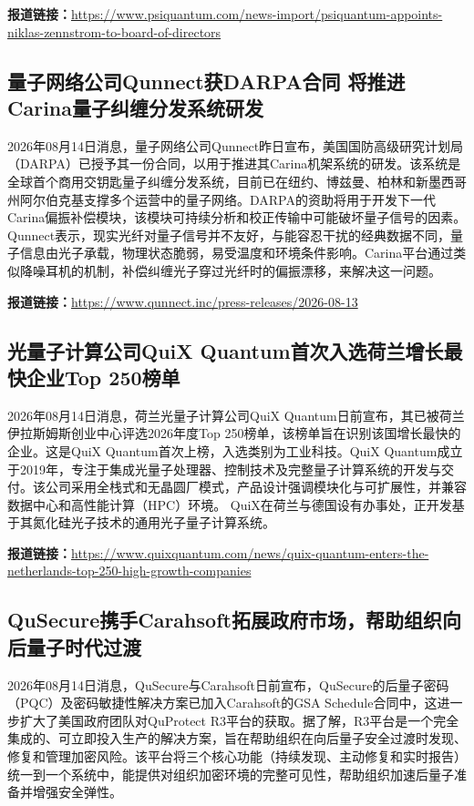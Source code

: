 \documentclass[12pt,a4paper]{ctexart}
\begin{document}
\noindent\textbf{报道链接：}\url{https://www.psiquantum.com/news-import/psiquantum-appoints-niklas-zennstrom-to-board-of-directors}

\subsection{ 量子网络公司Qunnect获DARPA合同 将推进Carina量子纠缠分发系统研发 }

2026年08月14日消息，量子网络公司Qunnect昨日宣布，美国国防高级研究计划局（DARPA）已授予其一份合同，以用于推进其Carina机架系统的研发。该系统是全球首个商用交钥匙量子纠缠分发系统，目前已在纽约、博兹曼、柏林和新墨西哥州阿尔伯克基支撑多个运营中的量子网络。DARPA的资助将用于开发下一代Carina偏振补偿模块，该模块可持续分析和校正传输中可能破坏量子信号的因素。Qunnect表示，现实光纤对量子信号并不友好，与能容忍干扰的经典数据不同，量子信息由光子承载，物理状态脆弱，易受温度和环境条件影响。Carina平台通过类似降噪耳机的机制，补偿纠缠光子穿过光纤时的偏振漂移，来解决这一问题。

\noindent\textbf{报道链接：}\url{https://www.qunnect.inc/press-releases/2026-08-13}

\subsection{ 光量子计算公司QuiX Quantum首次入选荷兰增长最快企业Top 250榜单 }

2026年08月14日消息，荷兰光量子计算公司QuiX Quantum日前宣布，其已被荷兰伊拉斯姆斯创业中心评选2026年度Top 250榜单，该榜单旨在识别该国增长最快的企业。这是QuiX Quantum首次上榜，入选类别为工业科技。QuiX Quantum成立于2019年，专注于集成光量子处理器、控制技术及完整量子计算系统的开发与交付。该公司采用全栈式和无晶圆厂模式，产品设计强调模块化与可扩展性，并兼容数据中心和高性能计算（HPC）环境。 QuiX在荷兰与德国设有办事处，正开发基于其氮化硅光子技术的通用光子量子计算系统。

\noindent\textbf{报道链接：}\url{https://www.quixquantum.com/news/quix-quantum-enters-the-netherlands-top-250-high-growth-companies}

\subsection{ QuSecure携手Carahsoft拓展政府市场，帮助组织向后量子时代过渡 }

2026年08月14日消息，QuSecure与Carahsoft日前宣布，QuSecure的后量子密码（PQC）及密码敏捷性解决方案已加入Carahsoft的GSA Schedule合同中，这进一步扩大了美国政府团队对QuProtect R3平台的获取。据了解，R3平台是一个完全集成的、可立即投入生产的解决方案，旨在帮助组织在向后量子安全过渡时发现、修复和管理加密风险。该平台将三个核心功能（持续发现、主动修复和实时报告）统一到一个系统中，能提供对组织加密环境的完整可见性，帮助组织加速后量子准备并增强安全弹性。
\end{document}
